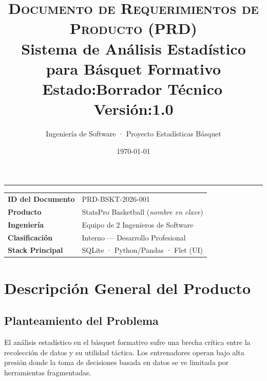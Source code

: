 \documentclass[11pt,a4paper]{article}
\title{
  \vspace{0.8cm}
  {\large\textcolor{secondary}{\textsc{Documento de Requerimientos de Producto (PRD)}}}\\[8pt]
  {\LARGE\bfseries\textcolor{primary}{Sistema de Análisis Estadístico}}\\
  {\Large\bfseries\textcolor{primary}{para Básquet Formativo}}\\[10pt]
  {\normalsize\textcolor{secondary}{Estado:\;\textbf{Borrador Técnico}\;\textbar\;\,Versión:\;\textbf{1.0}}}\\[6pt]
}
\author{\textcolor{secondary}{Ingeniería de Software · Proyecto Estadísticas Básquet}}
\date{\textcolor{secondary}{\today}}
\begin{document}
\maketitle
\thispagestyle{empty}

\vspace{-4pt}
\begin{center}
\textcolor{accent}{\rule{0.85\linewidth}{1.5pt}}
\end{center}
\vspace{6pt}

\begin{table}[h]
\centering
\renewcommand{\arraystretch}{1.3}
\begin{tabularx}{0.88\textwidth}{>{\bfseries\small}lX}
\rowcolor{headergray}
ID del Documento   & PRD-BSKT-2026-001 \\
Producto           & StatsPro Basketball (\textit{nombre en clave}) \\
\rowcolor{headergray}
Ingeniería         & Equipo de 2 Ingenieros de Software \\
Clasificación      & Interno — Desarrollo Profesional \\
\rowcolor{headergray}
Stack Principal    & SQLite · Python/Pandas · Flet (UI) \\
\end{tabularx}
\end{table}

\newpage
\tableofcontents
\newpage

\section{Descripción General del Producto}

\subsection{Planteamiento del Problema}
El análisis estadístico en el básquet formativo sufre una brecha crítica entre la recolección de datos y su utilidad táctica. Los entrenadores operan bajo alta presión donde la toma de decisiones basada en datos se ve limitada por herramientas fragmentadas.
\end{document}
